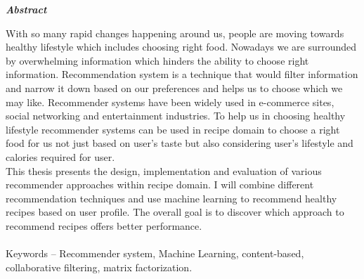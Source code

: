 \begin{center}

\textit{\bf Abstract}

\hfill\break

\end{center}

\vspace{1mm}

\normalsize
\noindent With so many rapid changes happening around us, people are moving towards healthy lifestyle which includes choosing right food. Nowadays we are surrounded by overwhelming information which hinders the ability to choose right information. Recommendation system is a technique that would filter information and narrow it down based on our preferences and helps us to choose which we may like.  Recommender systems have been widely used in e-commerce sites, social networking and entertainment industries. To help us in choosing healthy lifestyle recommender systems can be used in recipe domain to choose a right food for us not just based on user's taste but also considering user's lifestyle and calories required for user.  
\\
This thesis presents the design, implementation and evaluation of various recommender approaches within recipe domain.  I will combine different recommendation techniques and use machine learning to recommend healthy recipes based on user profile. The overall goal is to discover which approach to recommend recipes offers better performance. 
\\
\\
Keywords – Recommender system, Machine Learning, content-based, collaborative filtering, matrix factorization.




